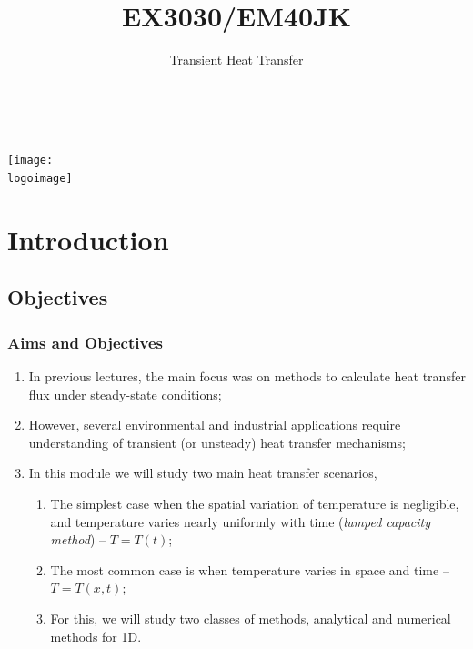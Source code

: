 \documentclass[10pt,compress,unknownkeysallowed]{beamer}
\institute{School of Engineering}
\title{EX3030/EM40JK}
\subtitle{Transient Heat Transfer}
\date[ ]{ }
\author[\shortname]{%
  \fullname\\\ttfamily{\emailaddress}
}
\newcommand{\logoimage}{../FigBanner/UoAHorizBanner}
\begin{document}
\begin{frame}
  \titlepage
  \vfill%
  \begin{center}
    \texttt{[image: \\logoimage]}
  \end{center}
\end{frame}




\section{Introduction} 


\subsection{Objectives}

\begin{frame}
 \frametitle{Aims and Objectives}
   \begin{enumerate}
     \item<1-> In previous lectures, the main focus was on methods to calculate heat transfer flux under steady-state conditions;
     \item<1-> However, several environmental and industrial applications require understanding of transient (or unsteady) heat transfer mechanisms;
     \item<2-> In this module we will study two main heat transfer scenarios,
         \begin{enumerate}
            \item<2-> The simplest case when the spatial variation of temperature is negligible, and temperature varies nearly uniformly with time ({\it lumped capacity method}) -- $T=T\left(t\right)$;
            \item<3-> The most common case is when temperature varies in space and time -- $T=T\left(x, t\right)$;
            \item<3-> For this, we will study two classes of methods, analytical and numerical methods for 1D. 
         \end{enumerate}
   \end{enumerate}
\end{frame}
\end{document}

